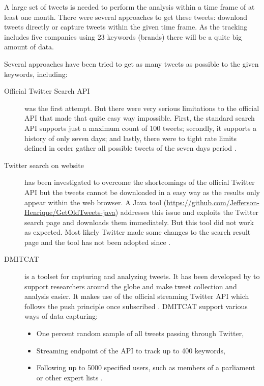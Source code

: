 A large set of tweets is needed to perform the analysis within a time frame of at least one month.
There were several approaches to get these tweets: download tweets directly or capture tweets within the given time frame.
As the tracking includes five companies using 23 keywords (brands) there will be a quite big amount of data.

Several approaches have been tried to get as many tweets as possible to the given keywords, including:

\begin{description}
  \item [Official Twitter Search \ac{API}] 
    was the first attempt.
    But there were very serious limitations to the official \ac{API} that made that quite easy way impossible.
    First, the standard search \ac{API} supports just a maximum count of 100 tweets;
    secondly, it supports a history of only seven days;
    and lastly, there were to tight rate limits defined in order gather all possible tweets of the seven days period \citep{TwitterInc.2018}.

  \item [Twitter search on website]
    has been investigated to overcome the shortcomings of the official Twitter \ac{API} but the tweets cannot be downloaded in a easy way as the results only appear within the web browser.
    A Java tool (\url{https://github.com/Jefferson-Henrique/GetOldTweets-java}) addresses this issue and exploits the Twitter search page and downloads them immediately.
    But this tool did not work as expected.
    Most likely Twitter made some changes to the search result page and the tool has not been adopted since  \citep{Jefferson2016}.

  \item [\ac{DMITCAT}]
    is a toolset for capturing and analyzing tweets.
    It has been developed by \citeauthor{Borra2014} to support researchers around the globe and make tweet collection and analysis easier.
    It makes use of the official streaming Twitter \ac{API} which follows the push principle once subscribed
    \citep{Borra2014}.
    \ac{DMITCAT} support various ways of data capturing:
    \begin{itemize}
      \item One percent random sample of all tweets passing through Twitter,
      \item Streaming endpoint of the \ac{API} to track up to 400 keywords,
      \item Following up to 5000 specified users, such as members of a parliament or other expert lists \citep{Borra2014}.
    \end{itemize}

\end{description}

